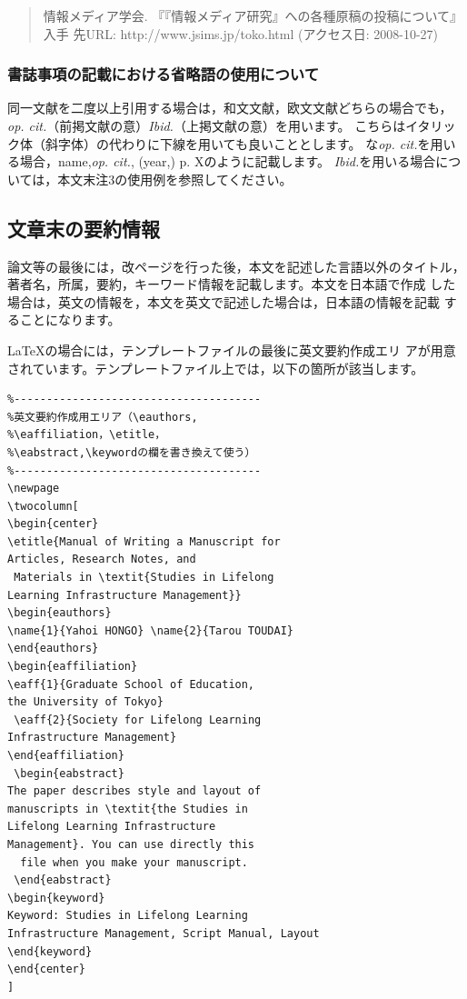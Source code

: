 \documentclass[b5paper,10pt,twocolumn,tombow]{jarticle}
\begin{document}
\begin{quote}
 情報メディア学会. 『『情報メディア研究』への各種原稿の投稿について』 入手
 先URL: http://www.jsims.jp/toko.html (アクセス日: 2008-10-27)
\end{quote}

\subsubsection{書誌事項の記載における省略語の使用について}

同一文献を二度以上引用する場合は，和文文献，欧文文献どちらの場合でも，
\textit{op. cit.}（前掲文献の意）\textit{Ibid.}（上掲文献の意）を用います。
こちらはイタリック体（斜字体）の代わりに下線を用いても良いこととします。
な\textit{op. cit.}を用いる場合，name,\textit{op. cit.}, (year,) p. Xのように記載します。
\textit{Ibid.}を用いる場合については，本文末注3の使用例を参照してください。


\subsection{文章末の要約情報}
論文等の最後には，改ページを行った後，本文を記述した言語以外のタイトル，
著者名，所属，要約，キーワード情報を記載します。本文を日本語で作成
した場合は，英文の情報を，本文を英文で記述した場合は，日本語の情報を記載
することになります。

\LaTeX{}の場合には，テンプレートファイルの最後に英文要約作成エリ
アが用意されています。テンプレートファイル上では，以下の箇所が該当します。

\small{}
\begin{verbatim}
%--------------------------------------
%英文要約作成用エリア（\eauthors,
%\eaffiliation，\etitle，
%\eabstract,\keywordの欄を書き換えて使う）
%--------------------------------------
\newpage
\twocolumn[
\begin{center}
\etitle{Manual of Writing a Manuscript for
Articles, Research Notes, and
 Materials in \textit{Studies in Lifelong
Learning Infrastructure Management}}
\begin{eauthors}
\name{1}{Yahoi HONGO} \name{2}{Tarou TOUDAI}
\end{eauthors}
\begin{eaffiliation}
\eaff{1}{Graduate School of Education,
the University of Tokyo}
 \eaff{2}{Society for Lifelong Learning
Infrastructure Management}
\end{eaffiliation}
 \begin{eabstract}
The paper describes style and layout of
manuscripts in \textit{the Studies in
Lifelong Learning Infrastructure
Management}. You can use directly this
  file when you make your manuscript.
 \end{eabstract}
\begin{keyword}
Keyword: Studies in Lifelong Learning
Infrastructure Management, Script Manual, Layout
\end{keyword}
\end{center}
]
\end{verbatim}
\normalsize
\end{document}

